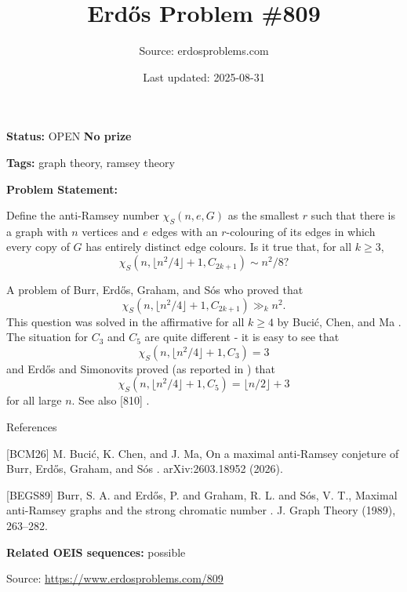 \documentclass{article}
\title{Erd\H{o}s Problem \#809}
\date{Last updated: 2025-08-31}
\author{Source: erdosproblems.com}
\begin{document}
\maketitle

\noindent\textbf{Status:} OPEN \quad \textbf{No prize}

\noindent\textbf{Tags:} graph theory, ramsey theory

\medskip

\noindent\textbf{Problem Statement:}

Define the anti-Ramsey number $\chi_S(n,e,G)$ as the smallest $r$ such that there is a graph with $n$ vertices and $e$ edges with an $r$-colouring of its edges in which every copy of $G$ has entirely distinct edge colours. Is it true that, for all $k\geq 3$,\[\chi_S(n, \lfloor n^2/4\rfloor+1,C_{2k+1})\sim n^2/8?\]




A problem of Burr, Erd\H{o}s, Graham, and S\'{o}s \cite{BEGS89} who proved that\[\chi_S(n, \lfloor n^2/4\rfloor+1,C_{2k+1})\gg_k n^2.\]This question was solved in the affirmative for all $k\geq 4$ by Buci\'{c}, Chen, and Ma \cite{BCM26}. The situation for $C_3$ and $C_5$ are quite different - it is easy to see that\[\chi_S(n, \lfloor n^2/4\rfloor+1,C_{3})=3\]and Erd\H{o}s and Simonovits proved (as reported in \cite{BEGS89}) that\[\chi_S(n, \lfloor n^2/4\rfloor+1,C_{5})=\lfloor n/2\rfloor+3\]for all large $n$. See also [810] .




References

[BCM26] M. Buci\'{c}, K. Chen, and J. Ma, On a maximal anti-Ramsey conjeture of Burr, Erd\H{o}s, Graham, and S\'{o}s . arXiv:2603.18952 (2026).

[BEGS89] Burr, S. A. and Erd\H{o}s, P. and Graham, R. L. and S\'os, V. T., Maximal anti-{R}amsey graphs and the strong chromatic number . J. Graph Theory (1989), 263--282.

\noindent\textbf{Related OEIS sequences:} possible


\bigskip
\noindent\small{Source: \url{https://www.erdosproblems.com/809}}
\end{document}
